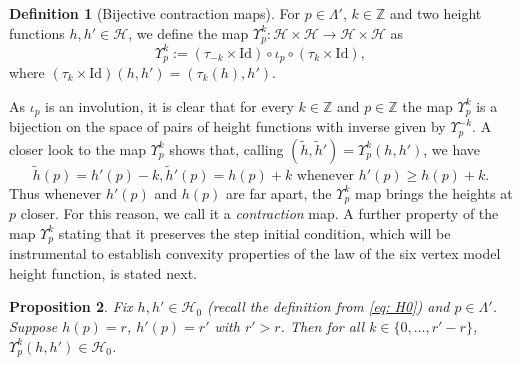 \documentclass[reqno,11pt]{amsart}
\numberwithin{equation}{section}
\newtheorem{proposition}{Proposition}[section]
\theoremstyle{definition}
\newtheorem{definition}[proposition]{Definition}
\begin{document}
\begin{definition}[Bijective contraction maps] \label{upsilonmap}
    For $p\in \Lambda'$, $k \in \mathbb{Z}$ and two height functions $h,h' \in \mathscr{H}$, we define the map $\Upsilon_p^k:\mathscr{H} \times \mathscr{H} \to \mathscr{H} \times \mathscr{H}$ as
    \begin{equation*}
        \Upsilon_p^k := (\tau_{-k} \times \mathrm{Id}) \circ \iota_p \circ (\tau_{k} \times \mathrm{Id}),
    \end{equation*}
    where $(\tau_k \times \mathrm{Id})(h,h') = ( \tau_k(h),h' )$.
\end{definition}

As $\iota_p$ is an involution, it is clear that for every $k\in \mathbb{Z}$ and $p \in \mathbb{Z}$ the map $\Upsilon_p^k$ is a bijection on the space of pairs of height functions with inverse given by $\Upsilon_p^{-k}$.  A closer look to the map $\Upsilon_p^k$ shows that, calling $(\widetilde{h},\widetilde{h}') = \Upsilon_p^k(h,h')$, we have
    \begin{equation} \label{eq:shrinkage at p}
         \widetilde{h}(p)=h'(p)-k, \widetilde{h}'(p)= h(p)+k \mbox{ whenever } h'(p)\ge h(p)+k.
    \end{equation}
    Thus whenever $h'(p)$ and $h(p)$ are far apart, the $\Upsilon_p^k$ map brings the heights at $p$ closer. For this reason, we call it a \textit{contraction} map. 
A further property of the map $\Upsilon_p^k$ stating that it preserves the step initial condition, which will be instrumental to establish convexity properties of the law of the six vertex model height function, is stated next.


\begin{proposition} \label{prop:contraction property}
    Fix $h,h' \in \mathscr{H}_0$ (recall the definition from \eqref{eq: H0}) and $p\in \Lambda'$. Suppose $h(p)=r$, $h'(p)=r'$ with $r'>r$. Then for all $k \in \{ 0, \dots, r'-r \}$,  $\Upsilon_p^k(h,h') \in \mathscr{H}_0^{}$.
\end{proposition}
\end{document}
